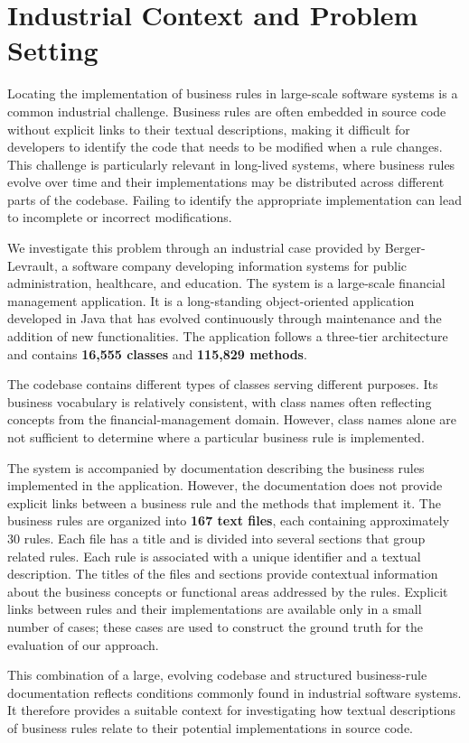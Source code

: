 \section{Industrial Context and Problem Setting}
\label{sec:industrialContext}

Locating the implementation of business rules in large-scale software systems is a common industrial challenge. Business rules are often embedded in source code without explicit links to their textual descriptions, making it difficult for developers to identify the code that needs to be modified when a rule changes. This challenge is particularly relevant in long-lived systems, where business rules evolve over time and their implementations may be distributed across different parts of the codebase. Failing to identify the appropriate implementation can lead to incomplete or incorrect modifications.

We investigate this problem through an industrial case provided by Berger-Levrault, a software company developing information systems for public administration, healthcare, and education. The system is a large-scale financial management application. It is a long-standing object-oriented application developed in Java that has evolved continuously through maintenance and the addition of new functionalities. The application follows a three-tier architecture and contains \textbf{16,555 classes} and \textbf{115,829 methods}.

The codebase contains different types of classes serving different purposes. Its business vocabulary is relatively consistent, with class names often reflecting concepts from the financial-management domain. However, class names alone are not sufficient to determine where a particular business rule is implemented.

The system is accompanied by documentation describing the business rules implemented in the application. However, the documentation does not provide explicit links between a business rule and the methods that implement it. The business rules are organized into \textbf{167 text files}, each containing approximately 30 rules. Each file has a title and is divided into several sections that group related rules. Each rule is associated with a unique identifier and a textual description. The titles of the files and sections provide contextual information about the business concepts or functional areas addressed by the rules. Explicit links between rules and their implementations are available only in a small number of cases; these cases are used to construct the ground truth for the evaluation of our approach.

This combination of a large, evolving codebase and structured business-rule documentation reflects conditions commonly found in industrial software systems. It therefore provides a suitable context for investigating how textual descriptions of business rules relate to their potential implementations in source code.